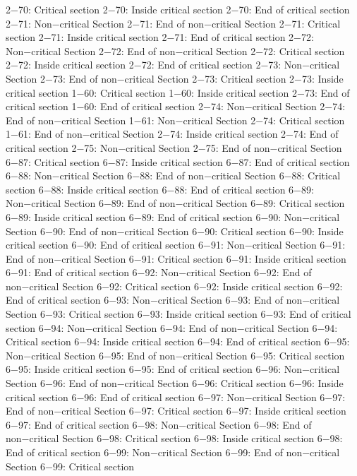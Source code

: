 2−70: Critical section
2−70: Inside critical section
2−70: End of critical section
2−71: Non−critical Section
2−71: End of non−critical Section
2−71: Critical section
2−71: Inside critical section
2−71: End of critical section
2−72: Non−critical Section
2−72: End of non−critical Section
2−72: Critical section
2−72: Inside critical section
2−72: End of critical section
2−73: Non−critical Section
2−73: End of non−critical Section
2−73: Critical section
2−73: Inside critical section
1−60: Critical section
1−60: Inside critical section
2−73: End of critical section
1−60: End of critical section
2−74: Non−critical Section
2−74: End of non−critical Section
1−61: Non−critical Section
2−74: Critical section
1−61: End of non−critical Section
2−74: Inside critical section
2−74: End of critical section
2−75: Non−critical Section
2−75: End of non−critical Section
6−87: Critical section
6−87: Inside critical section
6−87: End of critical section
6−88: Non−critical Section
6−88: End of non−critical Section
6−88: Critical section
6−88: Inside critical section
6−88: End of critical section
6−89: Non−critical Section
6−89: End of non−critical Section
6−89: Critical section
6−89: Inside critical section
6−89: End of critical section
6−90: Non−critical Section
6−90: End of non−critical Section
6−90: Critical section
6−90: Inside critical section
6−90: End of critical section
6−91: Non−critical Section
6−91: End of non−critical Section
6−91: Critical section
6−91: Inside critical section
6−91: End of critical section
6−92: Non−critical Section
6−92: End of non−critical Section
6−92: Critical section
6−92: Inside critical section
6−92: End of critical section
6−93: Non−critical Section
6−93: End of non−critical Section
6−93: Critical section
6−93: Inside critical section
6−93: End of critical section
6−94: Non−critical Section
6−94: End of non−critical Section
6−94: Critical section
6−94: Inside critical section
6−94: End of critical section
6−95: Non−critical Section
6−95: End of non−critical Section
6−95: Critical section
6−95: Inside critical section
6−95: End of critical section
6−96: Non−critical Section
6−96: End of non−critical Section
6−96: Critical section
6−96: Inside critical section
6−96: End of critical section
6−97: Non−critical Section
6−97: End of non−critical Section
6−97: Critical section
6−97: Inside critical section
6−97: End of critical section
6−98: Non−critical Section
6−98: End of non−critical Section
6−98: Critical section
6−98: Inside critical section
6−98: End of critical section
6−99: Non−critical Section
6−99: End of non−critical Section
6−99: Critical section

